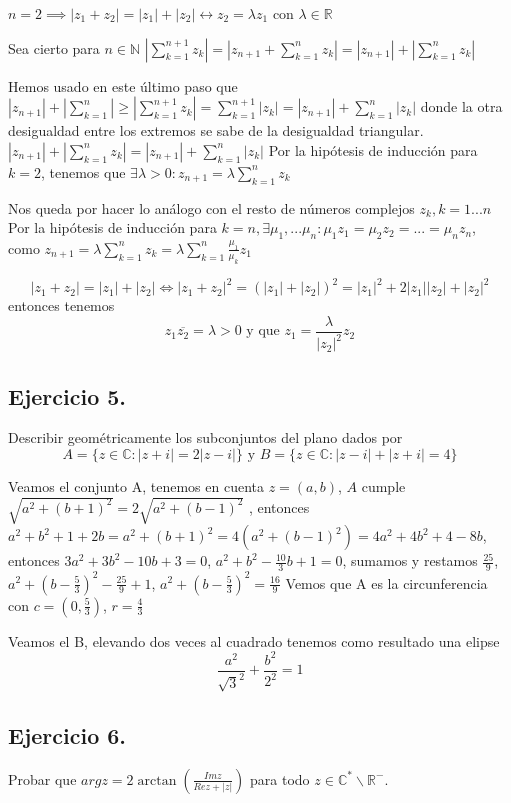 $n=2 \implies |z_1+z_2| = |z_1| + |z_2| \longleftrightarrow z_2 = \lambda z_1$ con $\lambda \in \mathbb{R}$

Sea cierto para $n\in\mathbb{N}$
$|\sum_{k=1}^{n+1} z_k| 
=
|z_{n+1} + \sum_{k=1}^n z_k|
=
|z_{n+1}| + |\sum_{k=1}^n z_k|$

Hemos usado en este último paso que
$|z_{n+1}|+|\sum_{k=1}^n| \geq |\sum_{k=1}^{n+1} z_k|=\sum_{k=1}^{n+1} |z_k| = |z_{n+1}| + \sum_{k=1}^n |z_k|$
donde la otra desigualdad entre los extremos se sabe de la desigualdad triangular.
$|z_{n+1}| + |\sum_{k=1}^n z_k| 
=
|z_{n+1}| + \sum_{k=1}^n |z_k|$
Por la hipótesis de inducción para $k=2$, tenemos que 
$\exists \lambda >0 : z_{n+1} = \lambda \sum_{k=1}^n z_k$

Nos queda por hacer lo análogo con el resto de números complejos $z_k,k=1...n$
Por la hipótesis de inducción para $k=n, \exists \mu_1,...\mu_n : \mu_1 z_1 = \mu_2 z_2=...= \mu_n z_n$,
como $z_{n+1} = \lambda \sum_{k=1}^n z_k 
=
\lambda \sum_{k=1}^n \frac{\mu_1}{\mu_k} z_1$

$$ |z_1+z_2| = |z_1|+|z_2| 
\Longleftrightarrow
|z_1+z_2|^2 = (|z_1|+|z_2|)^2 
=
|z_1|^2 + 2|z_1||z_2|+|z_2|^2$$
 entonces tenemos
$$z_1 \overline{z_2}=\lambda>0 \text{ y que } z_1 = \frac{\lambda}{|z_2|^2 }z_2 
$$


\subsection{Ejercicio 5.}
Describir geométricamente los subconjuntos del plano dados por
$$ A=\{ z\in\mathbb{C} : |z+i|=2|z-i| \} \text{ y } B=\{ z\in\mathbb{C} : |z-i| + |z+i| = 4 \} $$

Veamos el conjunto A, tenemos en cuenta $z=(a,b)$,
$A$ cumple $ \sqrt{a^2+(b+1)^2} = 2\sqrt{a^2+(b-1)^2}$
, entonces $a^2+b^2+1+2 b = a^2+(b+1)^2 = 4(a^2+(b-1)^2) = 4a^2+4b^2+4-8b$, entonces
$3a^2+3b^2-10b+3=0$, $a^2+b^2-\frac{10}{3}b+1=0$, sumamos y restamos $\frac{25}{9}$, $a^2+(b-\frac{5}{3})^2-\frac{25}{9}+1$, 
$a^2+(b-\frac{5}{3})^2=\frac{16}{9}$
Vemos que A es la circunferencia con $c=(0, \frac{5}{3})$, $r=\frac{4}{3}$

Veamos el B, elevando dos veces al cuadrado tenemos como resultado una elipse
$$ \frac{a^2}{\sqrt{3}^2} + \frac{b^2}{2^2} = 1 $$


\subsection{Ejercicio 6.}
Probar que $arg z = 2\arctan( \frac{Im z}{Re z + |z|} )$ para todo  $z\in\mathbb{C}^{\ast}\backslash\mathbb{R}^{-}$.

